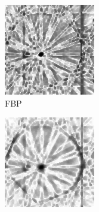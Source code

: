 \documentclass{article}
\begin{document}
\begin{figure}[!h]
    \begin{subfigure}[b]{0.19\linewidth}
        \includegraphics[width=\textwidth]{../images/potato/artefacts/no_noise/weightsIm_fbp30.png}
\captionsetup{labelformat=empty}       
 \caption{FBP}
    \end{subfigure}
    \begin{subfigure}[b]{0.2\linewidth}
        \includegraphics[width=\textwidth]{../images/potato/artefacts/no_noise/weightsIm_sirt30.png}

\end{subfigure}
\end{figure}
\end{document}
